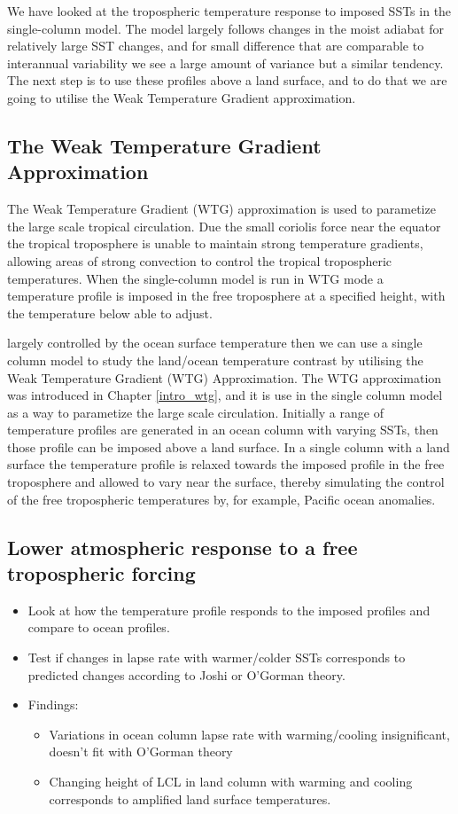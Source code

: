 We have looked at the tropospheric temperature response to imposed SSTs in the 
single-column model. The model largely follows changes in the moist adiabat for 
relatively large SST changes, and for small difference that are comparable to 
interannual variability we see a large amount of variance but a similar 
tendency. The next step is to use these profiles above a land surface, and to do 
that we are going to utilise the Weak Temperature Gradient approximation.

\subsection{The Weak Temperature Gradient Approximation}
The Weak Temperature Gradient (WTG) approximation is used to parametize the 
large scale tropical circulation. Due the small coriolis force near the equator 
the tropical troposphere is unable to maintain strong temperature gradients, 
allowing areas of strong convection to control the tropical tropospheric 
temperatures.  When the single-column model is run in WTG mode a temperature 
profile is imposed in the free troposphere at a specified height, with the 
temperature below able to adjust.

largely controlled by the ocean surface temperature then we can use a single 
column model to study the land/ocean temperature contrast by utilising the Weak 
Temperature Gradient (WTG) Approximation. The WTG approximation was introduced 
in Chapter \ref{intro_wtg}, and it is use in the single column model as a way to 
parametize the large scale circulation.
Initially a range of temperature profiles are generated in an ocean column with 
varying SSTs, then those profile can be imposed above a land surface.  In a 
single column with a land surface the temperature profile is relaxed towards the 
imposed profile in the free troposphere and allowed to vary near the surface, 
thereby simulating the control of the free tropospheric temperatures by, for 
example, Pacific ocean anomalies.

\subsection{Lower atmospheric response to a free tropospheric forcing}
\begin{itemize}
	\item Look at how the temperature profile responds to the imposed profiles 
		and compare to ocean profiles.
	\item Test if changes in lapse rate with warmer/colder SSTs corresponds to 
		predicted changes according to Joshi or O'Gorman theory.
	\item Findings:
		\begin{itemize}
			\item Variations in ocean column lapse rate with warming/cooling 
				insignificant, doesn't fit with O'Gorman theory
			\item Changing height of LCL in land column with warming and cooling 
				corresponds to amplified land surface temperatures.
		\end{itemize}
	\end{itemize}


